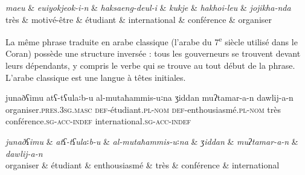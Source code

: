 {    \begin{dependency}[font=\footnotesize,arc edge, arc angle=80, text only label, label style={above}]
    \begin{deptext}
    \textit{maeu}  \& \textit{euiyokjeok-i-n} \& \textit{haksaeng-deul-i} \& \textit{kukje} \& \textit{hakhoi-leu} \& \textit{jojikha-nda}\\
    très  \& {motivé-être}  \& étudiant   \& international \& conférence \& organiser\\
    \end{deptext}
    \end{dependency}
    \z

    La même phrase traduite en arabe classique (l’arabe du 7\textsuperscript{e} siècle utilisé dans le Coran) possède une structure inversée : tous les gouverneurs se trouvent devant leurs dépendants, y compris le verbe qui se trouve au tout début de la phrase. L’arabe classique est une langue à têtes initiales.
    
    \ea
    \gll junaðʕimu  atʕ-tʕula꞉b-u al-mutaħammis-u꞉na ʒiddan muʔtamar-a-n  dawlij-a-n\\
    organiser.\textsc{pres.3sg.masc} \textsc{def}-étudiant.\textsc{pl-nom} \textsc{def}-enthousiasmé.\textsc{pl-nom}  très conférence.\textsc{sg-acc-indef}  international.\textsc{sg-acc-indef}\\
    
    \begin{dependency}[font=\footnotesize,arc edge, arc angle=80, text only label, label style={above}]
    \begin{deptext}
    \textit{junaðʕimu} \& \textit{atʕ-tʕula}꞉\textit{b-u} \& \textit{al-mutaħammis-u}꞉\textit{na} \& \textit{ʒiddan} \& \textit{muʔtamar-a-n} \& \textit{dawlij-a-n}\\
    organiser  \& étudiant \& enthousiasmé \& très \& conférence \& international\\
    \end{deptext}
    \end{dependency}
    \z

}
